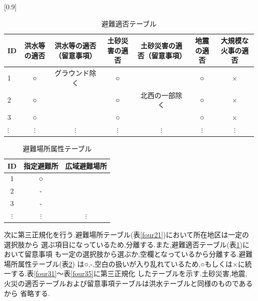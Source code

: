 \documentclass[a4j]{jarticle}
\begin{document}
      \begin{table}[H]
        \caption{避難適否テーブル}
        \label{four22}
        \begin{center}
          \scalebox{0.7}[0.9]{
            \begin{tabular}{l|c|c|c|c|c|c}\hline
              ID & 洪水等の適否 & 洪水等の適否（留意事項） & 土砂災害の適否 & 土砂災害の適否（留意事項） & 地震の適否  & 大規模な火事の適否 \\ \hline \hline
              1 & ○ & グラウンド除く & ○ &  & ○ & × \\ \hline
              2 & ○ &  & ○ & 北西の一部除く & ○ & × \\ \hline
              3 & ○ &  & ○ &  & ○ & × \\ \hline
              $\vdots$ & $\vdots$ & $\vdots$ & $\vdots$ & $\vdots$ & $\vdots$ & $\vdots$\\ \hline
            \end{tabular}
          }
        \end{center}
        \end{table}

        \begin{table}[H]
          \caption{避難場所属性テーブル}
          \label{four23}
          \begin{center}
              \begin{tabular}{c|c|c}\hline
                ID & 指定避難所 & 広域避難場所 \\ \hline
                1 & ○ & \\ \hline
                2 & - & \\ \hline
                3 & - & \\ \hline
                $\vdots$ & $\vdots$ & $\vdots$ \\ \hline
              \end{tabular}
          \end{center}
          \end{table}
        
          次に第三正規化を行う.避難場所テーブル(表\ref{four21})において所在地区は一定の選択肢から
          選ぶ項目になっているため,分離する.また,避難適否テーブル(表\ref{four22})において留意事項
          も一定の選択肢から選ぶか,空欄となっているから分離する.避難場所属性テーブル(表\ref{four23})
          は○,-,空白の扱いが入り乱れているため,○もしくは×に統一する.表\ref{four31}～表\ref{four35}に第三正規化
          したテーブルを示す.土砂災害,地震,火災の適否テーブルおよび留意事項テーブルは洪水テーブルと同様のものであるから
          省略する.
\end{document}

